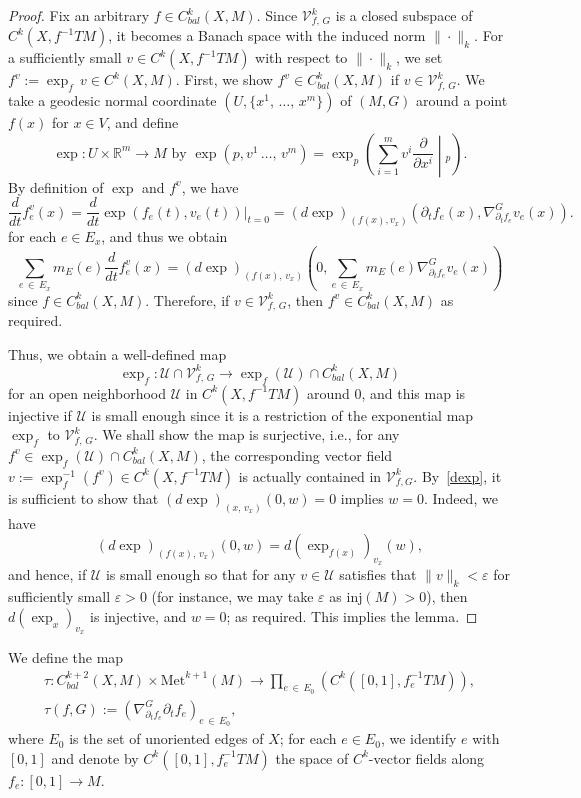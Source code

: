 \documentclass[11pt]{article}
\theoremstyle{definition}
\numberwithin{equation}{section}
\renewcommand{\t}{\tau}
\renewcommand{\epsilon}{\varepsilon}
\newcommand{\p}{\psi}
\newcommand*\Uc{\mathcal{U}}
\newcommand*\Vc{\mathcal{V}}
\newcommand{\R}{\mathbb{R}}
\newcommand*\inj{\mathrm{inj}}
\newcommand*\Met{\mathrm{Met}}
\renewcommand*\p{\partial}
\begin{document}
\begin{proof}
Fix an arbitrary $f\in C^k_{bal}(X, M)$. Since $\Vc_{f,\,G}^k$ is a closed subspace of $C^k(X, f^{-1}TM)$, it becomes a Banach space with the induced norm $\|\cdot\|_k$. For a sufficiently small $v\in C^k(X, f^{-1}TM)$ with respect to $\|\cdot\|_k$, we set $f^v:=\exp_f\, v\in C^k(X, M)$. First, we show $f^v\in C^k_{bal}(X, M)$ if $v\in \Vc_{f,\,G}^k$. We take a geodesic normal coordinate $(U,\{x^1,\,\ldots,\,x^m\})$ of $(M,G)$ around a point $f(x)$ for $x\in V$, and define
\[
\exp: U\times \R^m\to M\text{ by } \exp\left(p, v^1\,\ldots,\,v^m\right)=\exp_{p}\left(\sum_{i=1}^mv^i\frac{\p}{\p x^i}\middle|_{p}\right).
\]
By definition of $\exp$ and $f^v$, we have
\[
\frac{d}{d t} {f}^v_e(x)=\frac{d}{dt} \exp\left(f_e(t), v_e(t)\right)\Big|_{t=0}=\left(d\exp\right)_{\left(f(x), v_x\right)}\left(\p_t f_e(x), \nabla^G_{\p_t{f}_e}v_e(x)\right).
\]
for each $e\in E_x$, and thus we obtain
\begin{equation}\label{dexp}
\sum_{e\,\in\,E_x}m_E(e)\frac{d}{d t} f^v_e(x)=\left(d{\exp}\right)_{\left(f(x), \,v_x\right)}\left(0, \sum_{e\,\in\,E_x}m_E(e)\nabla^G_{\p_t{f}_e}v_e(x)\right)
\end{equation}
since $f\in C^k_{bal}(X, M)$. Therefore, if $v\in \Vc_{f,\,G}^k$, then $f^v\in C^k_{bal}(X, M)$ as required.

Thus, we obtain a well-defined map
\[
\exp_f: \Uc\cap \Vc_{f,\,G}^k\to \exp_f(\Uc)\cap C^k_{bal}(X,M)
\]
for an open neighborhood $\Uc$ in $C^k(X, f^{-1}TM)$ around $0$, and this map is injective if $\Uc$ is small enough since it is a restriction of the exponential map $\exp_f$ to $\Vc_{f,\,G}^k$. We shall show the map is surjective, i.e., for any $f^v\in \exp_f(\Uc)\cap C^k_{bal}(X, M)$, the corresponding vector field $v:=\exp^{-1}_f(f^v)\in C^k(X, f^{-1}TM)$ is actually contained in $\Vc_{f, G}^k$. By~\eqref{dexp}, it is sufficient to show that $(d\exp)_{(x,\,v_x)}(0,w)=0$ implies $w=0$. Indeed, we have
\[
(d\exp)_{\left(f(x),\,v_x\right)}(0,w)=d\left(\exp_{f(x)}\right)_{v_x}(w),
\]
and hence, if $\Uc$ is small enough so that for any $v \in \Uc$ satisfies that $\|v\|_k<\epsilon$ for sufficiently small $\epsilon>0$ (for instance, we may take $\epsilon$ as ${\inj}(M)>0$), then $d({\exp}_x)_{v_x}$ is injective, and $w=0$; as required. This implies the lemma.
\end{proof}


We define the map
\begin{gather*}
\t: C_{bal}^{k+2}(X, M) \times \Met^{k+1}(M) \to \prod_{e\,\in\,E_0}\left(C^k\left([0, 1], f_e^{-1}TM\right)\right),
\\
\t(f, G):=\left(\nabla_{\p_t f_e}^G \p_t f_e\right)_{e\,\in\,E_0},
\end{gather*}
where $E_0$ is the set of unoriented edges of $X$; for each $e \in E_0$, we identify $e$ with $[0, 1]$ and denote by $C^k([0, 1], f_e^{-1}TM)$ the space of $C^k$-vector fields along $f_e:[0, 1] \to M$.
\end{document}

